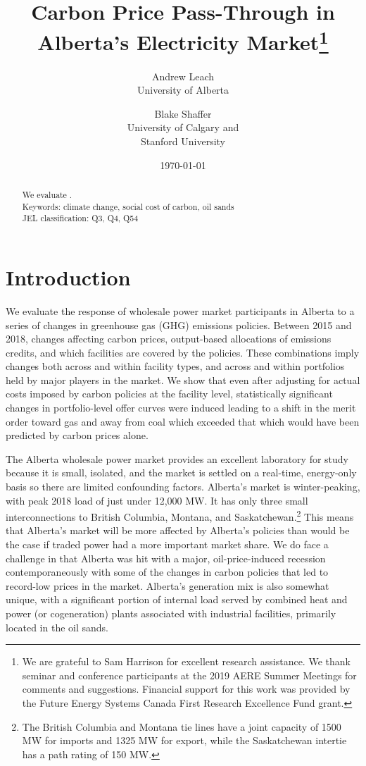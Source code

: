 \documentclass[12pt]{article}
\title{Carbon Price Pass-Through in Alberta's Electricity Market\thanks{We are grateful to Sam Harrison for excellent
research assistance. We thank seminar and conference participants at the 2019 AERE Summer Meetings for comments and suggestions. Financial support for this work was provided by the Future Energy Systems Canada First Research Excellence Fund grant.
}
}
\date{\today}
\author{Andrew Leach\\
 University of Alberta
 \and
Blake Shaffer\\University of Calgary and\\Stanford University
}
\begin{document}
\maketitle

\begin{abstract}
\noindent We evaluate .\\
\vspace{0.2in}
\noindent Keywords: climate change, social cost of carbon, oil sands\\
JEL classification: Q3, Q4, Q54
\end{abstract}

\thispagestyle{empty}
\newpage
\onehalfspacing


\section{Introduction}

We evaluate the response of wholesale power market participants in Alberta to a series of changes in greenhouse gas (GHG) emissions policies.  Between 2015 and 2018, changes affecting carbon prices, output-based allocations of emissions credits, and which facilities are covered by the policies.  These combinations imply changes both across and within facility types, and across and within portfolios held by major players in the market.  We show that even after adjusting for actual costs imposed by carbon policies at the facility level, statistically significant changes in portfolio-level offer curves were induced leading to a shift in the merit order toward gas and away from coal which exceeded that which would have been predicted by carbon prices alone.

The Alberta wholesale power market provides an excellent laboratory for study because it is small, isolated, and the market is settled on a real-time, energy-only basis so there are limited confounding factors. Alberta's market is winter-peaking, with peak 2018 load of just under 12,000 MW.  It has only three small interconnections to British Columbia, Montana, and Saskatchewan.\footnote{The British Columbia and Montana tie lines have a joint capacity of 1500 MW for imports and 1325 MW for export, while the Saskatchewan intertie has a path rating of 150 MW.} This means that Alberta's market will be more affected by Alberta's policies than would be the case if traded power had a more important market share. We do face a challenge in that Alberta was hit with a major, oil-price-induced recession contemporaneously with some of the changes in carbon policies that led to record-low prices in the market. Alberta's generation mix is also somewhat unique, with a significant portion of internal load served by combined heat and power (or cogeneration) plants associated with industrial facilities, primarily located in the oil sands.
\end{document}
